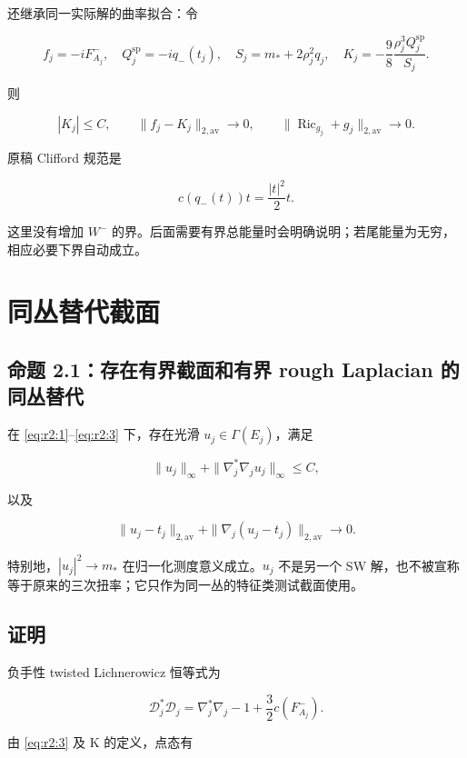 \documentclass[UTF8,11pt,openany,oneside,fontset=none]{ctexbook}
\begin{document}
还继承同一实际解的曲率拟合：令

\[
 f_j=-iF_{A_j}^-,\quad Q_j^{\mathrm{sp}}=-i q_-(t_j),\quad
 S_j=m_*+2\rho_j^2q_j,\quad
 K_j=-\frac98\frac{\rho_j^3Q_j^{\mathrm{sp}}}{S_j}.
\]

则

\[
 |K_j|\le C,\qquad
 \|f_j-K_j\|_{2,\mathrm{av}}\to0,
 \qquad \|\operatorname{Ric}_{g_j}+g_j\|_{2,\mathrm{av}}\to0.
 \tag{2.2}\label{eq:r2:2}
\]

原稿 Clifford 规范是

\[
 c(q_-(t))t=\frac{|t|^2}{2}t.
 \tag{2.3}\label{eq:r2:3}
\]

这里没有增加 \(W^-\) 的界。后面需要有界总能量时会明确说明；若尾能量为无穷，相应必要下界自动成立。

\section{同丛替代截面}\label{ch2:ux540cux4e1bux66ffux4ee3ux622aux9762}

\subsection{命题 2.1：存在有界截面和有界 rough Laplacian 的同丛替代}\label{ch2:ux547dux9898-2.1ux5b58ux5728ux6709ux754cux622aux9762ux548cux6709ux754c-rough-laplacian-ux7684ux540cux4e1bux66ffux4ee3}

在 \eqref{eq:r2:1}--\eqref{eq:r2:3} 下，存在光滑 \(u_j\in\Gamma(E_j)\)，满足

\[
 \|u_j\|_\infty+\|\nabla_j^*\nabla_j u_j\|_\infty\le C,
 \tag{2.4}\label{eq:r2:4}
\]

以及

\[
 \|u_j-t_j\|_{2,\mathrm{av}}+
 \|\nabla_j(u_j-t_j)\|_{2,\mathrm{av}}\longrightarrow0.
 \tag{2.5}\label{eq:r2:5}
\]

特别地，\(|u_j|^2\to m_*\) 在归一化测度意义成立。\(u_j\) 不是另一个 SW 解，也不被宣称等于原来的三次扭率；它只作为同一丛的特征类测试截面使用。

\subsection{证明}\label{ch2:ux8bc1ux660e}

负手性 twisted Lichnerowicz 恒等式为

\[
 \mathcal D_j^*\mathcal D_j
 =\nabla_j^*\nabla_j-1+\frac32c(F_{A_j}^-).
\]

由 \eqref{eq:r2:3} 及 K 的定义，点态有
\end{document}
